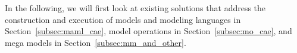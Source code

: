 In the following, we will first look at existing solutions that address the
construction and execution of models and modeling languages in Section~\ref{subsec:maml_cae}, model
operations in Section~\ref{subsec:mo_cae}, and mega models in Section~\ref{subsec:mm_and_other}.

